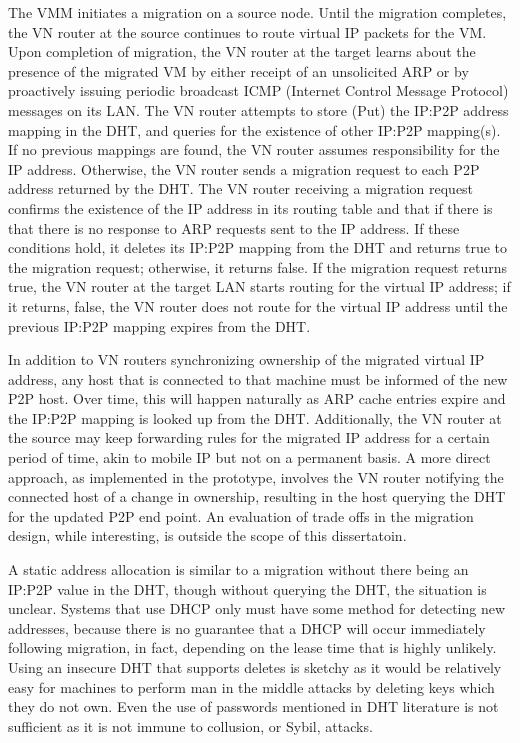 The VMM initiates a migration on a source node. Until the migration completes,
the VN router at the source continues to route virtual IP packets for the VM.
Upon completion of migration, the VN router at the target learns about the
presence of the migrated VM by either receipt of an unsolicited ARP or by
proactively issuing periodic broadcast ICMP (Internet Control Message Protocol)
messages on its LAN.  The VN router attempts to store (Put) the IP:P2P address
mapping in the DHT, and queries for the existence of other IP:P2P mapping(s).
If no previous mappings are found, the VN router assumes responsibility for the
IP address. Otherwise, the VN router sends a migration request to each P2P
address returned by the DHT. The VN router receiving a migration request
confirms the existence of the IP address in its routing table and that if there
is that there is no response to ARP requests sent to the IP address.  If these
conditions hold, it deletes its IP:P2P mapping from the DHT and returns true to
the migration request; otherwise, it returns false. If the migration request
returns true, the VN router at the target LAN starts routing for the virtual IP
address; if it returns, false, the VN router does not route for the virtual IP
address until the previous IP:P2P mapping expires from the DHT.

In addition to VN routers synchronizing ownership of the migrated virtual IP
address, any host that is connected to that machine must be informed of the new
P2P host.  Over time, this will happen naturally as ARP cache entries expire
and the IP:P2P mapping is looked up from the DHT.  Additionally, the VN router
at the source may keep forwarding rules for the migrated IP address for a
certain period of time, akin to mobile IP but not on a permanent basis.  A more
direct approach, as implemented in the prototype, involves the VN router
notifying the connected host of a change in ownership, resulting in the host
querying the DHT for the updated P2P end point.  An evaluation of trade offs in
the migration design, while interesting, is outside the scope of this
dissertatoin. 

A static address allocation is similar to a migration without there being an
IP:P2P value in the DHT, though without querying the DHT, the situation is
unclear.  Systems that use DHCP only must have some method for detecting new
addresses, because there is no guarantee that a DHCP will occur immediately
following migration, in fact, depending on the lease time that is highly
unlikely.  Using an insecure DHT that supports deletes is sketchy as it would
be relatively easy for machines to perform man in the middle attacks by
deleting keys which they do not own.  Even the use of passwords mentioned in
DHT literature is not sufficient as it is not immune to collusion, or Sybil,
attacks.

